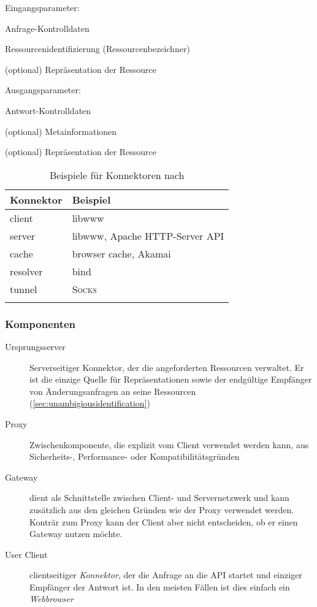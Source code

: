 Eingangsparameter:
\begin{compactitem}
    \item Anfrage-Kontrolldaten
    \item Ressourcenidentifizierung (Ressourcenbezeichner)
    \item[{\footnotesize (optional)}] Repräsentation der Ressource
\end{compactitem}
Ausgangsparameter:
\begin{compactitem}
    \item Antwort-Kontrolldaten
    \item[{\footnotesize (optional)}] Metainformationen
    \item[{\footnotesize (optional)}] Repräsentation der Ressource
\end{compactitem}


\begin{table}
    \begin{longtable}[c]{l l}
        \toprule
        \rowcolor{lightgray}
        \textbf{Konnektor}   & \textbf{Beispiel}\\
        \midrule
        client      & libwww\\
        server      & libwww, Apache \gls{HTTP}-Server \gls{API}\\
        cache       & browser cache, Akamai\\
        resolver    & bind\\
        tunnel      & \textsc{Socks}\\
        \bottomrule
        \caption{Beispiele für Konnektoren nach \cite{fieldingDissertation}}
        \label{tab:RESTconnectors}
    \end{longtable}
\end{table}       

\subsubsection{Komponenten}
\label{sec:RESTcomponents}

\begin{description}
    \item[Ursprungsserver] 
        Serverseitiger Konnektor, der die angeforderten Ressourcen verwaltet. Er ist die einzige Quelle für Repräsentationen sowie der endgültige Empfänger von Änderungsanfragen an seine Ressourcen (\cref{sec:unambigiousidentification})
    \item[Proxy] Zwischenkomponente, die explizit vom Client verwendet werden kann, aus Sicherheits-, Performance- oder Kompatibilitätsgründen
    \item[Gateway] dient als Schnittstelle zwischen Client- und Servernetzwerk und kann zusätzlich aus den gleichen Gründen wie der Proxy verwendet werden. Konträr zum Proxy kann der Client aber nicht entscheiden, ob er einen Gateway nutzen möchte.
    \item[User Client] 
        clientseitiger \emph{Konnektor}, der die Anfrage an die \gls{API} startet und einziger Empfänger der Antwort ist. In den meisten Fällen ist dies einfach ein \emph{Webbrowser}
\end{description}

